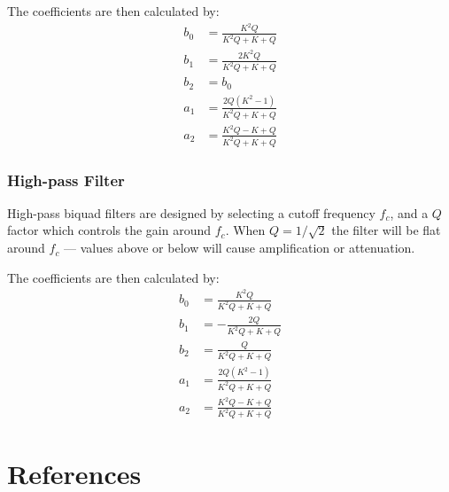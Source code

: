 \documentclass[11pt]{article}
\begin{document}
The coefficients are then calculated by:
\begin{align}
    b_0 &= \frac{K^2Q}{K^2Q + K + Q}\\
    b_1 &= \frac{2K^2Q}{K^2Q + K + Q}\\
    b_2 &= b_0\\
    a_1 &= \frac{2Q(K^2 - 1)}{K^2Q + K + Q}\\
    a_2 &= \frac{K^2Q - K + Q}{K^2Q + K + Q}
\end{align}
\cite{Zolzer:2011}

\subsubsection{High-pass Filter}
High-pass biquad filters are designed by selecting a cutoff frequency $f_c$, and a $Q$ factor which controls the gain around $f_c$.
When $Q = 1/\sqrt 2$ the filter will be flat around $f_c$ --- values above or below will cause amplification or attenuation.

The coefficients are then calculated by:
\begin{align}
    b_0 &= \frac{K^2Q}{K^2Q + K + Q}\\
    b_1 &= - \frac{2Q}{K^2Q + K + Q}\\
    b_2 &= \frac{Q}{K^2Q + K + Q}\\
    a_1 &= \frac{2Q(K^2 - 1)}{K^2Q + K + Q}\\
    a_2 &= \frac{K^2Q - K + Q}{K^2Q + K + Q}
\end{align}
\cite{Zolzer:2011}

\section{References}
{}


\printindex
\end{document}
